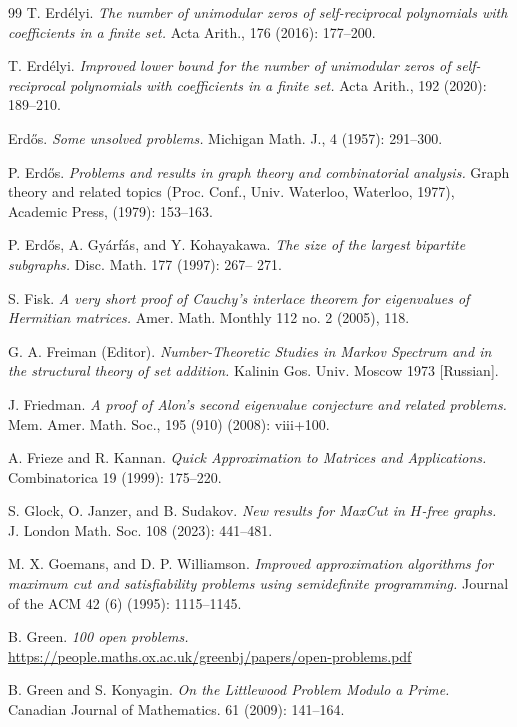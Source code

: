 \documentclass[11pt]{article}
\theoremstyle{plain}
\theoremstyle{definition}
\begin{document}
\begin{thebibliography}{99}
T. Erd\'elyi.
\emph{The number of unimodular zeros of self-reciprocal polynomials with coefficients in a finite set.}
Acta Arith., 176 (2016): 177--200.

T. Erd\'elyi.
\emph{Improved lower bound for the number of unimodular zeros of self-reciprocal polynomials with coefficients in a finite set.} 
Acta Arith., 192 (2020): 189--210.

 Erd\H{o}s.
\emph{Some unsolved problems.}
Michigan Math. J., 4 (1957): 291--300.

P. Erd\H{o}s.
\emph{Problems and results in graph theory and combinatorial analysis.}
Graph theory and related topics (Proc. Conf., Univ. Waterloo, Waterloo, 1977), Academic Press, (1979): 153--163.

P. Erd\H{o}s, A. Gy\'arf\'as, and Y. Kohayakawa.
\emph{The size of the largest bipartite subgraphs.}
Disc. Math. 177 (1997): 267-- 271.

S. Fisk.
\emph{A very short proof of Cauchy's interlace theorem for eigenvalues of Hermitian matrices.} 
Amer. Math. Monthly 112 no. 2 (2005), 118.

G. A. Freiman (Editor). 
\emph{Number-Theoretic Studies in Markov Spectrum and in the structural theory of set addition.}
Kalinin Gos. Univ. Moscow 1973 [Russian].

J. Friedman.
\emph{A proof of Alon's second eigenvalue conjecture and related problems.}
Mem. Amer. Math. Soc., 195 (910) (2008): viii+100.

A. Frieze and R. Kannan. 
\emph{Quick Approximation to Matrices and Applications.}
Combinatorica 19 (1999): 175--220.

S. Glock, O. Janzer, and B. Sudakov. 
\emph{New results for MaxCut in $H$-free graphs.}
J. London Math. Soc. 108 (2023): 441--481.

M. X. Goemans, and D. P. Williamson.
\emph{Improved approximation algorithms for maximum cut and satisfiability problems using semidefinite programming.} Journal of the ACM 42 (6) (1995): 1115--1145.

B. Green.
\emph{100 open problems.}
\url{https://people.maths.ox.ac.uk/greenbj/papers/open-problems.pdf}

B. Green and S. Konyagin. 
\emph{On the Littlewood Problem Modulo a Prime.} 
Canadian Journal of Mathematics. 61 (2009): 141--164.


\end{thebibliography}
\end{document}

